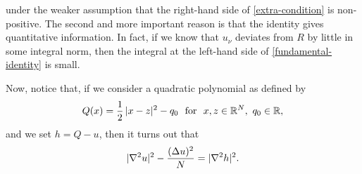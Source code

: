 \documentclass[a4paper,10pt]{amsart}
\numberwithin{equation}{section}
\begin{document}
under the weaker assumption that the right-hand side of \eqref{extra-condition} is non-positive.
The second and more important reason is that the identity gives  quantitative information. In fact, if we know that $u_\nu$ deviates from $R$ by little in some integral norm, then the integral at the left-hand side of \eqref{fundamental-identity} is small.  
\par
Now, notice that, if we consider a quadratic polynomial as defined by
$$
Q(x)=\frac12\,|x-z|^2-q_0 \ \mbox{ for } \ x, z\in\RR^N, \ q_0\in\RR,
$$
and we set $h=Q-u$, then it turns out that
$$
| \nabla^2 u|^2- \frac{(\Delta u)^2}{N}=|\nabla^2 h|^2.
$$
\end{document}
